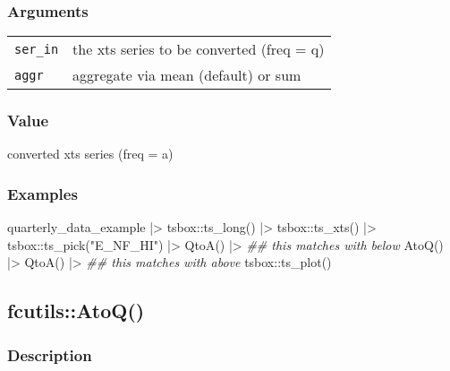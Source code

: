 \documentclass[
  letterpaper,
  DIV=11,
  numbers=noendperiod]{scrreport}
\newenvironment{Shaded}{\begin{snugshade}}{\end{snugshade}}
\newcommand{\DocumentationTok}[1]{\textcolor[rgb]{0.37,0.37,0.37}{\textit{#1}}}
\newcommand{\FunctionTok}[1]{\textcolor[rgb]{0.28,0.35,0.67}{#1}}
\newcommand{\NormalTok}[1]{\textcolor[rgb]{0.00,0.23,0.31}{#1}}
\newcommand{\SpecialCharTok}[1]{\textcolor[rgb]{0.37,0.37,0.37}{#1}}
\newcommand{\StringTok}[1]{\textcolor[rgb]{0.13,0.47,0.30}{#1}}
\begin{document}
\subsubsection{Arguments}\label{arguments-27}

\begin{longtable}[]{@{}ll@{}}
\toprule\noalign{}
\endhead
\bottomrule\noalign{}
\endlastfoot
\texttt{ser\_in} & the xts series to be converted (freq = q) \\
\texttt{aggr} & aggregate via mean (default) or sum \\
\end{longtable}

\subsubsection{Value}\label{value-27}

converted xts series (freq = a)

\subsubsection{Examples}\label{examples-27}

\begin{Shaded}
\begin{Highlighting}[]
\NormalTok{quarterly\_data\_example }\SpecialCharTok{|\textgreater{}}
\NormalTok{  tsbox}\SpecialCharTok{::}\FunctionTok{ts\_long}\NormalTok{() }\SpecialCharTok{|\textgreater{}}
\NormalTok{  tsbox}\SpecialCharTok{::}\FunctionTok{ts\_xts}\NormalTok{() }\SpecialCharTok{|\textgreater{}}
\NormalTok{  tsbox}\SpecialCharTok{::}\FunctionTok{ts\_pick}\NormalTok{(}\StringTok{"E\_NF\_HI"}\NormalTok{) }\SpecialCharTok{|\textgreater{}}
  \FunctionTok{QtoA}\NormalTok{() }\SpecialCharTok{|\textgreater{}} \DocumentationTok{\#\# this matches with below}
  \FunctionTok{AtoQ}\NormalTok{() }\SpecialCharTok{|\textgreater{}}
  \FunctionTok{QtoA}\NormalTok{() }\SpecialCharTok{|\textgreater{}} \DocumentationTok{\#\# this matches with above}
\NormalTok{  tsbox}\SpecialCharTok{::}\FunctionTok{ts\_plot}\NormalTok{()}
\end{Highlighting}
\end{Shaded}

\subsection{fcutils::AtoQ()}\label{fcutilsatoq}

\subsubsection{Description}\label{description-28}
\end{document}
